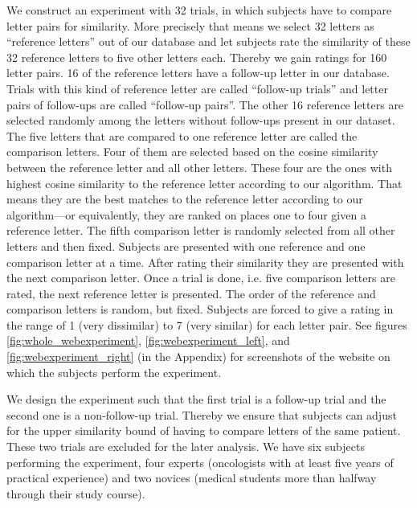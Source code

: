 We construct an experiment with 32 trials, in which subjects have to compare letter pairs for similarity. More precisely that means we select 32 letters as ``reference letters'' out of our database and let subjects rate the similarity of these 32 reference letters to five other letters each. Thereby we gain ratings for 160 letter pairs. 16 of the reference letters have a follow-up letter in our database. Trials with this kind of reference letter are called ``follow-up trials'' and letter pairs of follow-ups are called ``follow-up pairs''. The other 16 reference letters are selected randomly among the letters without follow-ups present in our dataset. The five letters that are compared to one reference letter are called the comparison letters. Four of them are selected based on the cosine similarity between the reference letter and all other letters. These four are the ones with highest cosine similarity to the reference letter according to our algorithm. That means they are the best matches to the reference letter according to our algorithm---or equivalently, they are ranked on places one to four given a reference letter. The fifth comparison letter is randomly selected from all other letters and then fixed. Subjects are presented with one reference and one comparison letter at a time. After rating their similarity they are presented with the next comparison letter. Once a trial is done, i.e. five comparison letters are rated, the next reference letter is presented. The order of the reference and comparison letters is random, but fixed. Subjects are forced to give a rating in the range of 1 (very dissimilar) to 7 (very similar) for each letter pair. See figures \ref{fig:whole_webexperiment}, \ref{fig:webexperiment_left}, and \ref{fig:webexperiment_right} (in the Appendix) for screenshots of the website on which the subjects perform the experiment.

We design the experiment such that the first trial is a follow-up trial and the second one is a non-follow-up trial. Thereby we ensure that subjects can adjust for the upper similarity bound of having to compare letters of the same patient. These two trials are excluded for the later analysis. We have six subjects performing the experiment, four experts (oncologists with at least five years of practical experience) and two novices (medical students more than halfway through their study course).





